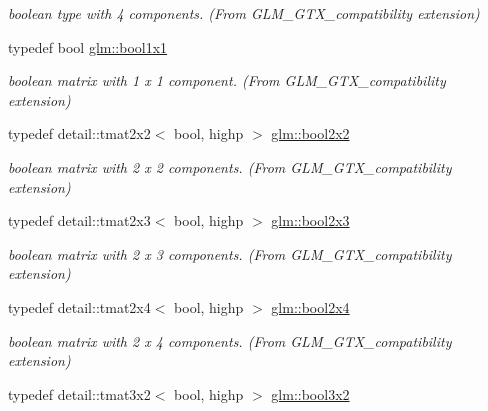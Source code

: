 \begin{DoxyCompactItemize}
\begin{DoxyCompactList}\small\item\em boolean type with 4 components. (From G\+L\+M\+\_\+\+G\+T\+X\+\_\+compatibility extension) \end{DoxyCompactList}\item 
typedef bool \hyperlink{group__gtx__compatibility_ga98d9d3da22aebc872ba38ce5afa0eff7}{glm\+::bool1x1}\hypertarget{group__gtx__compatibility_ga98d9d3da22aebc872ba38ce5afa0eff7}{}\label{group__gtx__compatibility_ga98d9d3da22aebc872ba38ce5afa0eff7}

\begin{DoxyCompactList}\small\item\em boolean matrix with 1 x 1 component. (From G\+L\+M\+\_\+\+G\+T\+X\+\_\+compatibility extension) \end{DoxyCompactList}\item 
typedef detail\+::tmat2x2$<$ bool, highp $>$ \hyperlink{group__gtx__compatibility_ga44cd09c0dad9ea163f038a342555867f}{glm\+::bool2x2}\hypertarget{group__gtx__compatibility_ga44cd09c0dad9ea163f038a342555867f}{}\label{group__gtx__compatibility_ga44cd09c0dad9ea163f038a342555867f}

\begin{DoxyCompactList}\small\item\em boolean matrix with 2 x 2 components. (From G\+L\+M\+\_\+\+G\+T\+X\+\_\+compatibility extension) \end{DoxyCompactList}\item 
typedef detail\+::tmat2x3$<$ bool, highp $>$ \hyperlink{group__gtx__compatibility_ga75013772bb088d107a1c1a994e7f9b14}{glm\+::bool2x3}\hypertarget{group__gtx__compatibility_ga75013772bb088d107a1c1a994e7f9b14}{}\label{group__gtx__compatibility_ga75013772bb088d107a1c1a994e7f9b14}

\begin{DoxyCompactList}\small\item\em boolean matrix with 2 x 3 components. (From G\+L\+M\+\_\+\+G\+T\+X\+\_\+compatibility extension) \end{DoxyCompactList}\item 
typedef detail\+::tmat2x4$<$ bool, highp $>$ \hyperlink{group__gtx__compatibility_gaf24096d8a88d274b94002386a3fcab0c}{glm\+::bool2x4}\hypertarget{group__gtx__compatibility_gaf24096d8a88d274b94002386a3fcab0c}{}\label{group__gtx__compatibility_gaf24096d8a88d274b94002386a3fcab0c}

\begin{DoxyCompactList}\small\item\em boolean matrix with 2 x 4 components. (From G\+L\+M\+\_\+\+G\+T\+X\+\_\+compatibility extension) \end{DoxyCompactList}\item 
typedef detail\+::tmat3x2$<$ bool, highp $>$ \hyperlink{group__gtx__compatibility_gacf961fda4c64459911f552cbffdbffa8}{glm\+::bool3x2}\hypertarget{group__gtx__compatibility_gacf961fda4c64459911f552cbffdbffa8}{}\label{group__gtx__compatibility_gacf961fda4c64459911f552cbffdbffa8}


\end{DoxyCompactItemize}
